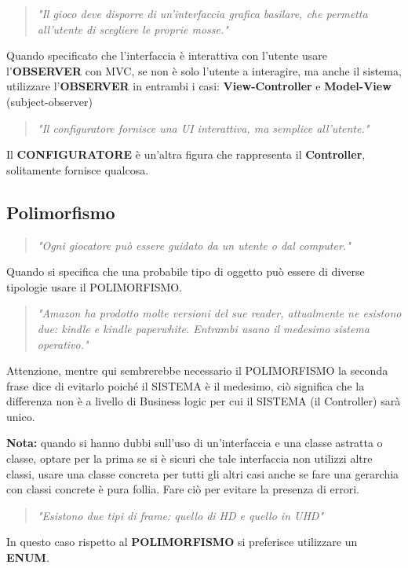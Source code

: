 \documentclass[a4paper,11pt]{article}
\begin{document}
	\begin{quote}
		\textit{"Il gioco deve disporre di un'interfaccia grafica basilare, che permetta all’utente di scegliere le proprie mosse."}
	\end{quote}
	
	Quando specificato che l'interfaccia è interattiva con l'utente usare l'\textbf{OBSERVER} con MVC, se non è solo l'utente a interagire, ma anche il sistema, utilizzare l'\textbf{OBSERVER} in entrambi i casi: \textbf{View-Controller} e \textbf{Model-View} (subject-observer)
	
	\begin{quote}
		\textit{"Il configuratore fornisce una UI interattiva, ma semplice all’utente."}
	\end{quote}
	Il \textbf{CONFIGURATORE} è un'altra figura che rappresenta il \textbf{Controller}, solitamente fornisce qualcosa.
	

\newpage
	\subsection{Polimorfismo}
	
	\begin{quote}
		\textit{"Ogni giocatore può essere guidato da un utente o dal computer."}
	\end{quote}
	
	Quando si specifica che una probabile tipo di oggetto può essere di diverse tipologie usare il POLIMORFISMO.
	
	\begin{quote}
		\textit{"Amazon ha prodotto molte versioni del sue reader, attualmente ne esistono due: kindle e kindle paperwhite. Entrambi usano il medesimo sistema operativo."}
	\end{quote}
	
	Attenzione, mentre qui sembrerebbe necessario il POLIMORFISMO la seconda frase dice di evitarlo poiché il SISTEMA è il medesimo, ciò significa che la differenza non è a livello di Business logic per cui il SISTEMA (il Controller) sarà unico.
	
	\textbf{Nota:} quando si hanno dubbi sull'uso di un'interfaccia e una classe astratta o classe, optare per la prima se si è sicuri che tale interfaccia non utilizzi altre classi, usare una classe concreta per tutti gli altri casi anche se fare una gerarchia con classi concrete è pura follia. Fare ciò per evitare la presenza di errori.
	
	\begin{quote}
		\textit{"Esistono due tipi di frame: quello di HD e quello in UHD"}
	\end{quote}
	In questo caso rispetto al \textbf{POLIMORFISMO} si preferisce utilizzare un \textbf{ENUM}.
	
\end{document}
